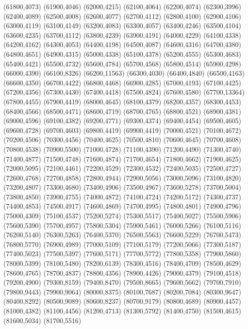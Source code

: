 (61800,4073)
(61900,4046)
(62000,4215)
(62100,4064)
(62200,4074)
(62300,3996)
(62400,4089)
(62500,4008)
(62600,4077)
(62700,4112)
(62800,4100)
(62900,4106)
(63000,4119)
(63100,4149)
(63200,4083)
(63300,4057)
(63400,4246)
(63500,4104)
(63600,4235)
(63700,4112)
(63800,4239)
(63900,4191)
(64000,4229)
(64100,4338)
(64200,4162)
(64300,4053)
(64400,4198)
(64500,4087)
(64600,4316)
(64700,4380)
(64800,4651)
(64900,4315)
(65000,4338)
(65100,4378)
(65200,4555)
(65300,4683)
(65400,4421)
(65500,4732)
(65600,4784)
(65700,4568)
(65800,4514)
(65900,4298)
(66000,4390)
(66100,8326)
(66200,11563)
(66300,4030)
(66400,4840)
(66500,4163)
(66600,4350)
(66700,4422)
(66800,4468)
(66900,4285)
(67000,4193)
(67100,4425)
(67200,4356)
(67300,4430)
(67400,4418)
(67500,4824)
(67600,4580)
(67700,13364)
(67800,4455)
(67900,4419)
(68000,4645)
(68100,4379)
(68200,4357)
(68300,4453)
(68400,4566)
(68500,4471)
(68600,4719)
(68700,4765)
(68800,4521)
(68900,4381)
(69000,4596)
(69100,4382)
(69200,4771)
(69300,4374)
(69400,4454)
(69500,4605)
(69600,4728)
(69700,4603)
(69800,4419)
(69900,4419)
(70000,4521)
(70100,4672)
(70200,4506)
(70300,4456)
(70400,4625)
(70500,4810)
(70600,4645)
(70700,4608)
(70800,4538)
(70900,5500)
(71000,4728)
(71100,4390)
(71200,4490)
(71300,4740)
(71400,4877)
(71500,4748)
(71600,4874)
(71700,4654)
(71800,4662)
(71900,4625)
(72000,5095)
(72100,4461)
(72200,4529)
(72300,4532)
(72400,5035)
(72500,4727)
(72600,4768)
(72700,4858)
(72800,4944)
(72900,5056)
(73000,5096)
(73100,4820)
(73200,4807)
(73300,4680)
(73400,4906)
(73500,4967)
(73600,5278)
(73700,5004)
(73800,4850)
(73900,4755)
(74000,4872)
(74100,4724)
(74200,5172)
(74300,4737)
(74400,4853)
(74500,4917)
(74600,4869)
(74700,4995)
(74800,4801)
(74900,4796)
(75000,4309)
(75100,4537)
(75200,5274)
(75300,5517)
(75400,5027)
(75500,5906)
(75600,5390)
(75700,4957)
(75800,5304)
(75900,5461)
(76000,5266)
(76100,5116)
(76200,5140)
(76300,5263)
(76400,5370)
(76500,5563)
(76600,5229)
(76700,5473)
(76800,5770)
(76900,4989)
(77000,5109)
(77100,5179)
(77200,5066)
(77300,5187)
(77400,5023)
(77500,5397)
(77600,5171)
(77700,5772)
(77800,5358)
(77900,5860)
(78000,5399)
(78100,5480)
(78200,6139)
(78300,4516)
(78400,4709)
(78500,4629)
(78600,4765)
(78700,4837)
(78800,4356)
(78900,4426)
(79000,4379)
(79100,4518)
(79200,4900)
(79300,8159)
(79400,8470)
(79500,8665)
(79600,5662)
(79700,7910)
(79800,9443)
(79900,9064)
(80000,8375)
(80100,7687)
(80200,7084)
(80300,9647)
(80400,8292)
(80500,9089)
(80600,8237)
(80700,9179)
(80800,4689)
(80900,4457)
(81000,4382)
(81100,4456)
(81200,4713)
(81300,5792)
(81400,4750)
(81500,4615)
(81600,5034)
(81700,5516)
